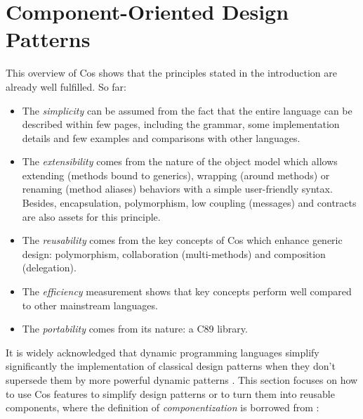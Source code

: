 \documentclass[preprint,10pt]{sigplanconf}
\newcommand{\ProgLang}[1]{{\sc #1}\xspace}
\newcommand{\Cos}       {\ProgLang{Cos}}
\begin{document}
\section{Component-Oriented Design Patterns\label{sec:pat}}


This overview of \Cos shows that the principles stated in the introduction are already well fulfilled. So far:

\begin{itemize}
\item The {\em simplicity} can be assumed from the fact that the entire language can be described within few pages, including the grammar, some implementation details and few examples and comparisons with other languages.

\item The {\em extensibility} comes from the nature of the object model which allows extending (methods bound to generics), wrapping (around methods) or renaming (method aliases) behaviors with a simple user-friendly syntax. Besides, encapsulation, polymorphism, low coupling (messages) and contracts are also assets for this principle.

\item The {\em reusability} comes from the key concepts of \Cos which enhance generic design: polymorphism, collaboration (multi-methods) and composition (delegation).

\item The {\em efficiency} measurement shows that key concepts perform well compared to other mainstream languages.

\item The {\em portability} comes from its nature: a C89 library.
\end{itemize}

It is widely acknowledged that dynamic programming languages simplify significantly the implementation of classical design patterns \cite{gof95} when they don't supersede them by more powerful dynamic patterns \cite{cocoa07,nor96,sul02}. This section focuses on how to use \Cos features to simplify design patterns or to turn them into reusable components, where the definition of {\em componentization} is borrowed from \cite{rege99,meyer06-1}:

\vspace{1em}\noindent
{}
\vspace{1ex}
\end{document}
